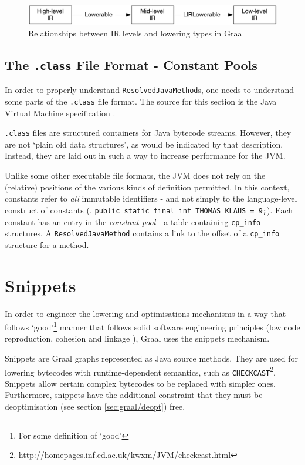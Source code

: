 \begin{figure}
	\centering
	\includegraphics[width=1.0\textwidth]{graphics/lowering-stages.pdf}
	\caption{Relationships between IR levels and lowering types in Graal}
	\label{fig:lowering-stages}
\end{figure}

	\subsection{The \texttt{.class} File Format - Constant Pools} \label{sec:graal/classformat}
	In order to properly understand \texttt{ResolvedJavaMethod}s, one needs to understand some parts of the \texttt{.class} file format. The source for this section is the Java Virtual Machine specification \citep[p.~69]{JVMSpec}.
		
	\texttt{.class} files are structured containers for Java bytecode streams. However, they are not `plain old data structures', as would be indicated by that description. Instead, they are laid out in such a way to increase performance for the JVM.
				
	Unlike some other executable file formats, the JVM does not rely on the (relative) positions of the various kinds of definition permitted. In this context, constants refer to \emph{all} immutable identifiers - and not simply to the language-level construct of constants (\eg, \texttt{public static final int THOMAS\_KLAUS = 9;}). Each constant has an entry in the \emph{constant pool} - a table containing \texttt{cp\_info} structures. A \texttt{ResolvedJavaMethod} contains a link to the offset of a \texttt{cp\_info} structure for a method.
		
\section{Snippets} \label{sec:graal/snippets}
In order to engineer the lowering and optimisations mechanisms in a way that follows `good'\footnote{For some definition of `good'} manner that follows solid software engineering principles (low code reproduction, cohesion and linkage \etc), Graal uses the snippets mechanism.

Snippets are Graal graphs represented as Java source methods. They are used for lowering bytecodes with runtime-dependent semantics, such as \texttt{CHECKCAST}\footnote{\url{http://homepages.inf.ed.ac.uk/kwxm/JVM/checkcast.html}}. Snippets allow certain complex bytecodes to be replaced with simpler ones. Furthermore, snippets have the additional constraint that they must be deoptimisation (see section \ref{sec:graal/deopt}) free.

